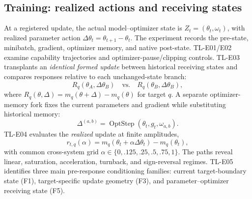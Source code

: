 \documentclass{article}
\begin{document}
\subsection{Training: realized actions and receiving states}
At a registered update, the actual model--optimizer state is $Z_t=(\theta_t,\omega_t)$, with realized parameter action $\Delta\theta_t=\theta_{t+1}-\theta_t$. The experiment records the pre-state, minibatch, gradient, optimizer memory, and native post-state. TL-E01/E02 examine capability trajectories and optimizer-pause/clipping controls. TL-E03 transplants an \emph{identical formed update} between historical receiving states and compares responses relative to each unchanged-state branch:
\begin{equation}
 R_q(\theta_A,\Delta\theta_B)\quad\text{vs.}\quad R_q(\theta_B,\Delta\theta_B),
 \label{eq:receiver}
\end{equation}
where $R_q(\theta,\Delta)=m_q(\theta+\Delta)-m_q(\theta)$ for target $q$. A separate optimizer-memory fork fixes the current parameters and gradient while substituting historical memory:
\begin{equation}
 \Delta^{(a,b)}=\operatorname{OptStep}(\theta_t,g_t,\omega_{a,b}).
 \label{eq:optmem}
\end{equation}
TL-E04 evaluates the \emph{realized} update at finite amplitudes,
\begin{equation}
 r_{t,q}(\alpha)=m_q(\theta_t+\alpha\Delta\theta_t)-m_q(\theta_t),
 \label{eq:response}
\end{equation}
with common cross-system grid $\alpha\in\{0,.125,.25,.5,.75,1\}$. The paths reveal linear, saturation, acceleration, turnback, and sign-reversal regimes. TL-E05 identifies three main pre-response conditioning families: current target-boundary state (F1), target-specific update geometry (F3), and parameter--optimizer receiving state (F5).
\end{document}
